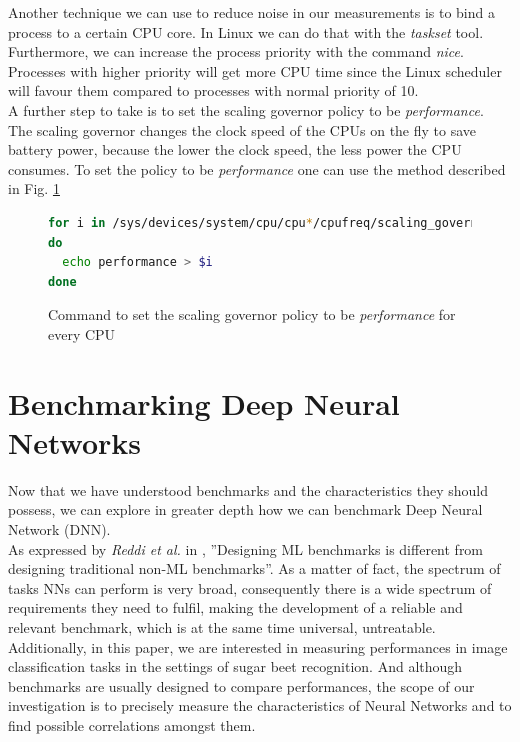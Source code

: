 Another technique we can use to reduce noise in our measurements is to bind a process to a certain CPU core. In Linux we can do that with the \textit{taskset} tool. \cite{LinuxManualWeb}\\
Furthermore, we can increase the process priority with the command \textit{nice}. Processes with higher priority will get more CPU time since the Linux scheduler will favour them compared to processes with normal priority of 10. \cite{LinuxManualWeb}\\
A further step to take is to set the scaling governor policy to be \textit{performance}. The scaling governor changes the clock speed of the CPUs on the fly to save battery power, because the lower the clock speed, the less power the CPU consumes. To set the policy to be \textit{performance} one can use the method described in Fig. \ref{fig:per_sca}
\begin{figure}[h]
\begin{lstlisting}[language=bash]
for i in /sys/devices/system/cpu/cpu*/cpufreq/scaling_governor
do
  echo performance > $i
done
\end{lstlisting}
\caption{Command to set the scaling governor policy to be \textit{performance} for every CPU}
\label{fig:per_sca}
\end{figure}



\section{Benchmarking Deep Neural Networks}\label{benchmarking_nn}
Now that we have understood benchmarks and the characteristics they should possess, we can explore in greater depth how we can benchmark Deep Neural Network (DNN).\\
As expressed by \textit{Reddi et al. } in \cite{reddi2020mlperf}, ''Designing ML benchmarks is different from designing traditional non-ML benchmarks''. As a matter of fact, the spectrum of tasks NNs can perform is very broad, consequently there is a wide spectrum of requirements they need to fulfil, making the development of a reliable and relevant benchmark, which is at the same time universal, untreatable. Additionally, in this paper, we are interested in measuring performances in image classification tasks in the settings of sugar beet recognition. And although benchmarks are usually designed to compare performances, the scope of our investigation is to precisely measure the characteristics of Neural Networks and to find possible correlations amongst them.



